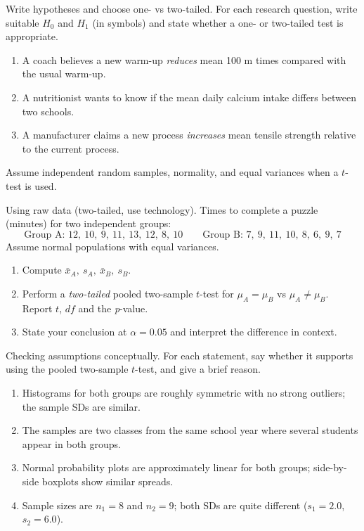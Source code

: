 \documentclass[11pt]{article}
\def\textbf#1{#1}%
\def\mathrm#1{#1}%
\newcounter{question}
\begin{document}
\begin{question}
\textbf{Write hypotheses and choose one- vs two-tailed.}
For each research question, write suitable $H_0$ and $H_1$ (in symbols) and state whether a one- or two-tailed test is appropriate.
\begin{enumerate}
  \item A coach believes a new warm-up \emph{reduces} mean 100 m times compared with the usual warm-up.
  \item A nutritionist wants to know if the mean daily calcium intake differs between two schools.
  \item A manufacturer claims a new process \emph{increases} mean tensile strength relative to the current process.
\end{enumerate}
Assume independent random samples, normality, and equal variances when a $t$-test is used.
\end{question}

\begin{question}
\textbf{Using raw data (two-tailed, use technology).}
Times to complete a puzzle (minutes) for two independent groups:
\[
\text{Group A: } 12,\ 10,\ 9,\ 11,\ 13,\ 12,\ 8,\ 10 \qquad
\text{Group B: } 7,\ 9,\ 11,\ 10,\ 8,\ 6,\ 9,\ 7
\]
Assume normal populations with equal variances.
\begin{enumerate}
  \item Compute $\bar{x}_A,\ s_A,\ \bar{x}_B,\ s_B$.
  \item Perform a \emph{two-tailed} pooled two-sample $t$-test for $\mu_A=\mu_B$ vs $\mu_A\neq\mu_B$.
        Report $t$, $\mathrm{df}$ and the \emph{p}-value.
  \item State your conclusion at $\alpha=0.05$ and interpret the difference in context.
\end{enumerate}
\end{question}

\begin{question}
\textbf{Checking assumptions conceptually.}
For each statement, say whether it supports using the pooled two-sample $t$-test, and give a brief reason.
\begin{enumerate}
  \item Histograms for both groups are roughly symmetric with no strong outliers; the sample SDs are similar.
  \item The samples are two classes from the same school year where several students appear in both groups.
  \item Normal probability plots are approximately linear for both groups; side-by-side boxplots show similar spreads.
  \item Sample sizes are $n_1=8$ and $n_2=9$; both SDs are quite different ($s_1=2.0$, $s_2=6.0$).
\end{enumerate}
\end{question}
\end{document}
